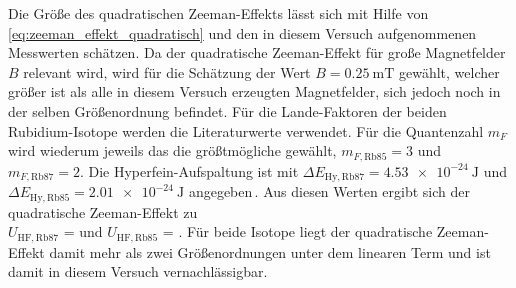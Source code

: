 Die Größe des quadratischen Zeeman-Effekts lässt sich mit Hilfe von \cref{eq:zeeman_effekt_quadratisch}
und den in diesem Versuch aufgenommenen Messwerten schätzen. Da der quadratische Zeeman-Effekt für große
Magnetfelder $B$ relevant wird, wird für die Schätzung der Wert $B = \SI{0.25}{\milli\tesla}$ gewählt,
welcher größer ist als alle in diesem Versuch erzeugten Magnetfelder, sich jedoch noch in der selben 
Größenordnung befindet. Für die Lande-Faktoren der beiden Rubidium-Isotope  werden die Literaturwerte 
verwendet. Für die Quantenzahl $m_{F}$ wird wiederum jeweils das die größtmögliche gewählt,
$m_{F,\mathrm{Rb85}} = 3$ und $m_{F,\mathrm{Rb87}} = 2$. Die Hyperfein-Aufspaltung ist 
mit $\Delta E_{\mathrm{Hy},\mathrm{Rb87}} = \SI{4.53e-24}{\joule}$ und $\Delta E_{\mathrm{Hy},
\mathrm{Rb85}} = \SI{2.01e-24}{\joule}$ angegeben\,\cite{V21}. Aus diesen Werten ergibt sich der quadratische
Zeeman-Effekt zu \\$U_{\mathrm{HF},\mathrm{Rb87}}$ = 
und $U_{\mathrm{HF},\mathrm{Rb85}}$ = .
Für beide Isotope liegt der quadratische Zeeman-Effekt damit mehr als zwei Größenordnungen unter dem 
linearen Term und ist damit in diesem Versuch vernachlässigbar. 
 
